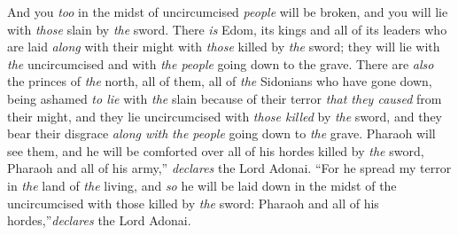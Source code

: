 \begin{biblechapter}
\verse And you \textit{too} in the midst of uncircumcised \textit{people} will be broken, and you will lie with \textit{those} slain by \textit{the} sword.
\verse There \textit{is} Edom, its kings and all of its leaders who are laid \textit{along} with their might with \textit{those} killed by \textit{the} sword; they will lie with \textit{the} uncircumcised and with \textit{the people} going down to the grave.
\verse There are \textit{also} the princes of \textit{the} north, all of them, all of \textit{the} Sidonians who have gone down, being ashamed \textit{to lie} with \textit{the} slain because of their terror \textit{that they caused} from their might, and they lie uncircumcised with \textit{those killed} by \textit{the} sword, and they bear their disgrace \textit{along with} \textit{the people} going down to \textit{the} grave.
\verse Pharaoh will see them, and he will be comforted over all of his hordes killed by \textit{the} sword, Pharaoh and all of his army,” \textit{declares} the Lord Adonai.
\verse “For he spread my terror in \textit{the} land of \textit{the} living, and \textit{so} he will be laid down in the midst of the uncircumcised with those killed by \textit{the} sword: Pharaoh and all of his hordes,”\textit{declares} the Lord Adonai.
\end{biblechapter}

